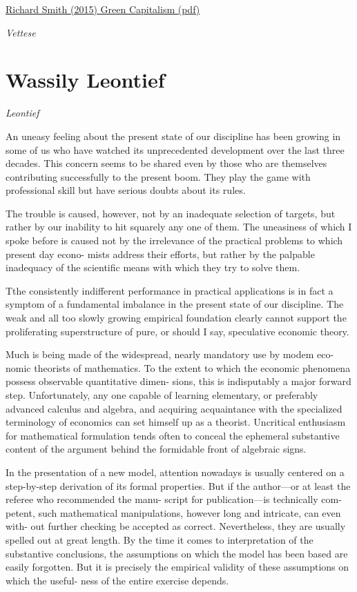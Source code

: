 \documentclass[
]{book}
\begin{document}
\href{pdf/Richard_Smith_Green_Capitalism_the_God_that_Failed.pdf}{Richard Smith (2015) Green Capitalism (pdf)}

\emph{Vettese}

\citet{vettese_2020}

\hypertarget{wassily-leontief}{%
\section{Wassily Leontief}\label{wassily-leontief}}

\emph{Leontief}

An uneasy feeling about the
present state of our discipline has been
growing in some of us who have watched
its unprecedented development over the
last three decades. This concern seems to
be shared even by those who are themselves
contributing successfully to the
present boom. They play the game with
professional skill but have serious doubts
about its rules.

The trouble
is caused, however, not by an inadequate
selection of targets, but rather by our
inability to hit squarely any one of them.
The uneasiness of which I spoke before is
caused not by the irrelevance of the practical
problems to which present day econo-
mists address their efforts, but rather by
the palpable inadequacy of the scientific
means with which they try to solve them.

Tthe consistently indifferent
performance in practical applications is in
fact a symptom of a fundamental imbalance
in the present state of our discipline.
The weak and all too slowly growing empirical
foundation clearly cannot support
the proliferating superstructure of pure, or
should I say, speculative economic theory.

Much is being made of the widespread,
nearly mandatory use by modem eco-
nomic theorists of mathematics. To the
extent to which the economic phenomena
possess observable quantitative dimen-
sions, this is indisputably a major forward
step. Unfortunately, any one capable of
learning elementary, or preferably advanced
calculus and algebra, and acquiring
acquaintance with the specialized terminology
of economics can set himself up as a
theorist.
Uncritical enthusiasm for mathematical
formulation tends often to conceal
the ephemeral substantive content of
the argument behind the formidable front
of algebraic signs.

In the presentation of a new model,
attention nowadays is usually centered on
a step-by-step derivation of its formal
properties. But if the author---or at least
the referee who recommended the manu-
script for publication---is technically com-
petent, such mathematical manipulations,
however long and intricate, can even with-
out further checking be accepted as
correct. Nevertheless, they are usually
spelled out at great length. By the time it
comes to interpretation of the substantive
conclusions, the assumptions on which the
model has been based are easily forgotten.
But it is precisely the empirical validity
of these assumptions on which the useful-
ness of the entire exercise depends.
\end{document}
